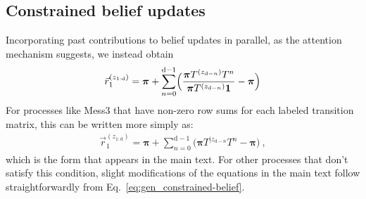 \documentclass{article}
\theoremstyle{plain}
\theoremstyle{definition}
\theoremstyle{remark}
\newcommand{\stationary}{\boldsymbol{\pi}}
\begin{document}
\subsection{Constrained belief updates}

Incorporating past contributions to belief updates in parallel, as the attention mechanism suggests, we instead obtain
\begin{align}
	\vec{r}_1^{(z_{1:\text{d}})} = \stationary  + \sum_{n=0}^{\text{d}-1} \Bigl( \frac{\stationary T^{(z_{\text{d}-n})} T^{n} }{ \stationary T^{(z_{\text{d}-n})}  \boldsymbol{1} } - \stationary \Bigr)
	\label{eq:gen_constrained-belief}
\end{align}
For processes like Mess3 that have non-zero row sums for each labeled transition matrix,
this can be written more simply as:
\begin{align}
	\vec{r}_1^{(z_{1:\text{d}})} = \stationary  + \sum_{n=0}^{\text{d}-1} \bigl( \stationary T^{|z_{\text{d}-n}} T^{n} - \stationary \bigr) ~,
\end{align}
which is the form that appears in the main text.
For other processes that don't satisfy this condition, slight modifications of the equations in the main text
follow straightforwardly from Eq.~\eqref{eq:gen_constrained-belief}.


% 
%
\end{document}
